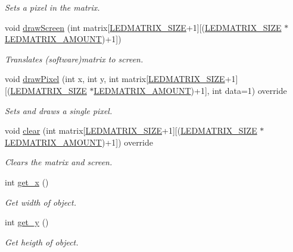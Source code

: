 \begin{DoxyCompactItemize}
\begin{DoxyCompactList}\small\item\em Sets a pixel in the matrix. \end{DoxyCompactList}\item 
void \hyperlink{classmax7219_l_e_d_ace27bb3d99143c9c70cfead632e93f89}{draw\+Screen} (int matrix\mbox{[}\hyperlink{max7219_l_e_dconstants_8hpp_a2a4cf20d00f170bb1778318f645ab6cb}{L\+E\+D\+M\+A\+T\+R\+I\+X\+\_\+\+S\+I\+ZE}+1\mbox{]}\mbox{[}(\hyperlink{max7219_l_e_dconstants_8hpp_a2a4cf20d00f170bb1778318f645ab6cb}{L\+E\+D\+M\+A\+T\+R\+I\+X\+\_\+\+S\+I\+ZE} $\ast$\hyperlink{max7219_l_e_dconstants_8hpp_aa3f1c3f51823e34beb0682e7f799793b}{L\+E\+D\+M\+A\+T\+R\+I\+X\+\_\+\+A\+M\+O\+U\+NT})+1\mbox{]})
\begin{DoxyCompactList}\small\item\em Translates (software)matrix to screen. \end{DoxyCompactList}\item 
void \hyperlink{classmax7219_l_e_d_a6ce14869c58cf742e39e16620a4a724f}{draw\+Pixel} (int x, int y, int matrix\mbox{[}\hyperlink{max7219_l_e_dconstants_8hpp_a2a4cf20d00f170bb1778318f645ab6cb}{L\+E\+D\+M\+A\+T\+R\+I\+X\+\_\+\+S\+I\+ZE}+1\mbox{]}\mbox{[}(\hyperlink{max7219_l_e_dconstants_8hpp_a2a4cf20d00f170bb1778318f645ab6cb}{L\+E\+D\+M\+A\+T\+R\+I\+X\+\_\+\+S\+I\+ZE} $\ast$\hyperlink{max7219_l_e_dconstants_8hpp_aa3f1c3f51823e34beb0682e7f799793b}{L\+E\+D\+M\+A\+T\+R\+I\+X\+\_\+\+A\+M\+O\+U\+NT})+1\mbox{]}, int data=1) override
\begin{DoxyCompactList}\small\item\em Sets and draws a single pixel. \end{DoxyCompactList}\item 
void \hyperlink{classmax7219_l_e_d_a5ea755271f6306d1f0e97ec1f7c2c7c0}{clear} (int matrix\mbox{[}\hyperlink{max7219_l_e_dconstants_8hpp_a2a4cf20d00f170bb1778318f645ab6cb}{L\+E\+D\+M\+A\+T\+R\+I\+X\+\_\+\+S\+I\+ZE}+1\mbox{]}\mbox{[}(\hyperlink{max7219_l_e_dconstants_8hpp_a2a4cf20d00f170bb1778318f645ab6cb}{L\+E\+D\+M\+A\+T\+R\+I\+X\+\_\+\+S\+I\+ZE} $\ast$\hyperlink{max7219_l_e_dconstants_8hpp_aa3f1c3f51823e34beb0682e7f799793b}{L\+E\+D\+M\+A\+T\+R\+I\+X\+\_\+\+A\+M\+O\+U\+NT})+1\mbox{]}) override
\begin{DoxyCompactList}\small\item\em Clears the matrix and screen. \end{DoxyCompactList}\item 
int \hyperlink{classmax7219_l_e_d_a42f5d4ddc8337981f6f32fbee145447f}{get\+\_\+x} ()
\begin{DoxyCompactList}\small\item\em Get width of object. \end{DoxyCompactList}\item 
int \hyperlink{classmax7219_l_e_d_ae3e7e73188d7abc8664b5bfca72bf4a5}{get\+\_\+y} ()
\begin{DoxyCompactList}\small\item\em Get heigth of object. \end{DoxyCompactList}\end{DoxyCompactItemize}
